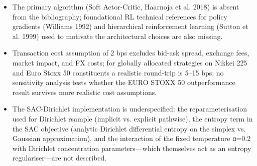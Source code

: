 \documentclass[11pt]{article}
\begin{document}
\begin{itemize}[leftmargin=*]
  \item The primary algorithm (Soft Actor-Critic, Haarnoja et al. 2018) is absent from the bibliography; foundational RL technical references for policy gradients (Williams 1992) and hierarchical reinforcement learning (Sutton et al. 1999) used to motivate the architectural choices are also missing.
  \item Transaction cost assumption of 2 bps excludes bid-ask spread, exchange fees, market impact, and FX costs; for globally allocated strategies on Nikkei 225 and Euro Stoxx 50 constituents a realistic round-trip is 5–15 bps; no sensitivity analysis tests whether the EURO STOXX 50 outperformance result survives more realistic cost assumptions.
  \item The SAC-Dirichlet implementation is underspecified: the reparameterisation used for Dirichlet rsample (implicit vs. explicit pathwise), the entropy term in the SAC objective (analytic Dirichlet differential entropy on the simplex vs. Gaussian approximation), and the interaction of the fixed temperature α=0.2 with Dirichlet concentration parameters—which themselves act as an entropy regulariser—are not described.
\end{itemize}
\end{document}
